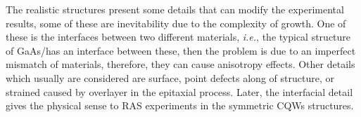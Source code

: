 The realistic structures present some details that can modify the experimental results, some of these are inevitability due to the complexity of growth. One of these is the interfaces between two different materials, \textit{i.e.}, the typical structure of GaAs/\algaas has an interface between these, then the problem is due to an imperfect mismatch of materials,
therefore, they can cause anisotropy effects. Other details which usually are considered are
surface, point defects along of structure, or strained caused by overlayer in the epitaxial
process. Later, the interfacial detail gives the physical sense to RAS experiments in the
symmetric \gls{CQWs} structures.

